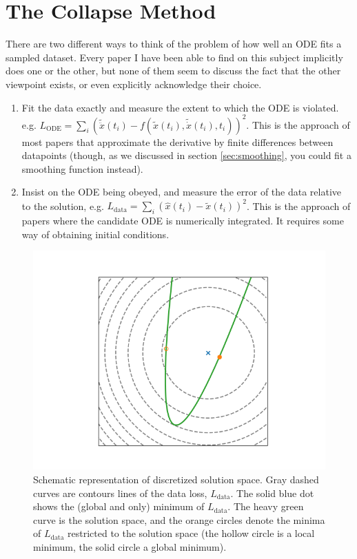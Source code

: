 \documentclass{article}
\begin{document}
\section{The Collapse Method}
\label{sec:method}

There are two different ways to think of the problem of how well an ODE fits a sampled dataset. Every paper I have been able to find on this subject implicitly does one or the other, but none of them seem to discuss the fact that the other viewpoint exists, or even explicitly acknowledge their choice.
\begin{enumerate}
\item Fit the data exactly and measure the extent to which the ODE is violated. e.g. $L_{\mathrm{ODE}} = \sum_i \left( \tilde{\ddot{x}}(t_i) - f(\tilde{x}(t_i), \tilde{\dot{x}}(t_i), t_i)\right)^2$.
This is the approach of most papers that approximate the derivative by finite differences between datapoints (though, as we discussed in section \ref{sec:smoothing}, you could fit a smoothing function instead).
\item Insist on the ODE being obeyed, and measure the error of the data relative to the solution, e.g. $L_{\mathrm{data}} = \sum_i \left( \hat{x}(t_i) - \tilde{x}(t_i) \right)^2$.
This is the approach of papers where the candidate ODE is numerically integrated. It requires some way of obtaining initial conditions. 
\end{enumerate}

\begin{figure}
\includegraphics{images/method/disc_space_viz.png}
\centering
\caption{
Schematic representation of discretized solution space.
Gray dashed curves are contours lines of the data loss, $L_{\mathrm{data}}$.
The solid blue dot shows the (global and only) minimum of $L_{\mathrm{data}}$.
The heavy green curve is the solution space, and the orange circles denote the minima of $L_{\mathrm{data}}$ restricted to the solution space (the hollow circle is a local minimum, the solid circle a global minimum).
}
\label{fig:disc_space_viz}
\end{figure}
\end{document}
